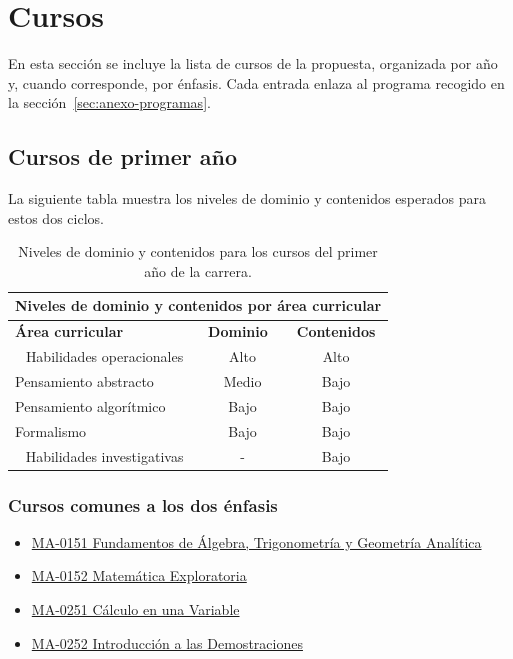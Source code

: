 
\section{Cursos}

En esta sección se incluye la lista de cursos de la propuesta, organizada por año y, cuando corresponde, por énfasis. Cada entrada enlaza al programa recogido en la sección~\ref{sec:anexo-programas}.

\subsection{Cursos de primer año}

La siguiente tabla muestra los niveles de dominio y contenidos esperados para estos dos ciclos.

\begin{table}[H]
\begin{center}
\begin{tabular}{|ccc|}
\hline
\multicolumn{3}{|c|}{\cellcolor[HTML]{00C0F3} \textbf{Niveles de dominio y contenidos por área curricular}} \\ \hline
\multicolumn{1}{|l|}{\cellcolor[HTML]{8ED8F8}\textbf{Área curricular}} & \multicolumn{1}{l|}{\cellcolor[HTML]{8ED8F8}\textbf{Dominio}} & \cellcolor[HTML]{8ED8F8}\textbf{Contenidos} \\ \hline
\multicolumn{1}{|c|}{Habilidades operacionales} & \multicolumn{1}{c|}{Alto} & Alto \\ \hline
\multicolumn{1}{|l|}{Pensamiento abstracto} & \multicolumn{1}{c|}{Medio} & Bajo \\ \hline
\multicolumn{1}{|l|}{Pensamiento algorítmico} & \multicolumn{1}{c|}{Bajo} & Bajo \\ \hline
\multicolumn{1}{|l|}{Formalismo} & \multicolumn{1}{c|}{Bajo} & Bajo \\ \hline
\multicolumn{1}{|c|}{Habilidades investigativas} & \multicolumn{1}{c|}{-} & Bajo \\ \hline
\end{tabular}
\end{center}
\caption{Niveles de dominio y contenidos para los cursos del primer año de la carrera.}
\end{table}

\subsubsection*{Cursos comunes a los dos énfasis}

\begin{itemize}
    \item \hyperlink{MA0151}{MA-0151 Fundamentos de Álgebra, Trigonometría y Geometría Analítica}
    \item \hyperlink{MA0152}{MA-0152 Matemática Exploratoria}
    \item \hyperlink{MA0251}{MA-0251 Cálculo en una Variable}
    \item \hyperlink{MA0252}{MA-0252 Introducción a las Demostraciones}
\end{itemize}


